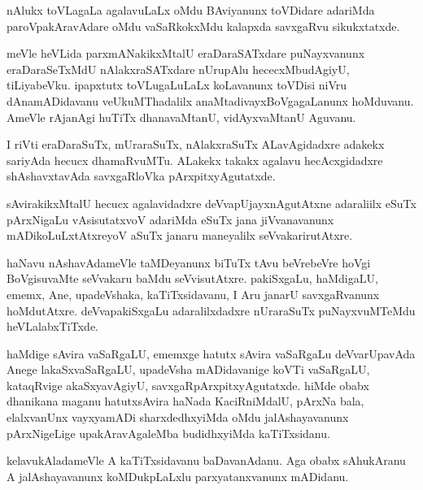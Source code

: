 \documentclass{article}
\begin{document}
\begin{mng}%
nAlukx toVLagaLa agalavuLaLx oMdu BAviyanunx toVDidare
adariMda paroVpakAravAdare oMdu vaSaRkokxMdu kalapxda savxgaRvu sikukxtatxde.
\end{mng}

\begin{mng}%
meVle heVLida parxmANakikxMtalU eraDaraSATxdare puNayxvanunx
eraDaraSeTxMdU nAlakxraSATxdare nUrupAlu hececxMbudAgiyU, tiLiyabeVku.
ipapxtutx toVLugaLuLaLx koLavanunx toVDisi niVru dAnamADidavanu veUkuMThadalilx
anaMtadivayxBoVgagaLanunx hoMduvanu. AmeVle rAjanAgi huTiTx
dhanavaMtanU, vidAyxvaMtanU Aguvanu.
\end{mng}

\begin{mng}%
I riVti eraDaraSuTx, mUraraSuTx, nAlakxraSuTx ALavAgidadxre
adakekx sariyAda hecucx dhamaRvuMTu. ALakekx takakx agalavu hecAcxgidadxre
shAshavxtavAda savxgaRloVka pArxpitxyAgutatxde.
\end{mng}

\begin{mng}%
sAvirakikxMtalU hecucx agalavidadxre deVvapUjayxnAgutAtxne
adaraliilx eSuTx pArxNigaLu vAsisutatxvoV adariMda eSuTx jana jiVvanavanunx
mADikoLuLxtAtxreyoV aSuTx janaru maneyalilx seVvakarirutAtxre.
\end{mng}

\begin{mng}%
haNavu nAshavAdameVle taMDeyanunx biTuTx tAvu beVrebeVre
hoVgi BoVgisuvaMte seVvakaru baMdu seVvisutAtxre. pakiSxgaLu, haMdigaLU,
ememx, Ane, upadeVshaka, kaTiTxsidavanu, I Aru janarU savxgaRvanunx
hoMdutAtxre. deVvapakiSxgaLu adaralilxdadxre nUraraSuTx puNayxvuMTeMdu heVLalabxTiTxde.
\end{mng}

\begin{mng}%
haMdige sAvira vaSaRgaLU, ememxge hatutx sAvira vaSaRgaLu
deVvarUpavAda Anege lakaSxvaSaRgaLU, upadeVsha mADidavanige koVTi vaSaRgaLU,
kataqRvige akaSxyavAgiyU, savxgaRpArxpitxyAgutatxde. hiMde obabx
dhanikana maganu hatutxsAvira haNada KaciRniMdalU, pArxNa bala, elalxvanUnx 
vayxyamADi sharxdedhxyiMda oMdu jalAshayavanunx pArxNigeLige upakAravAgaleMba
budidhxyiMda kaTiTxsidanu.
\end{mng}

\begin{mng}%
kelavukAladameVle A kaTiTxsidavanu baDavanAdanu. Aga obabx
sAhukAranu A jalAshayavanunx koMDukpLaLxlu parxyatanxvanunx mADidanu.
\end{mng}
\end{document}
